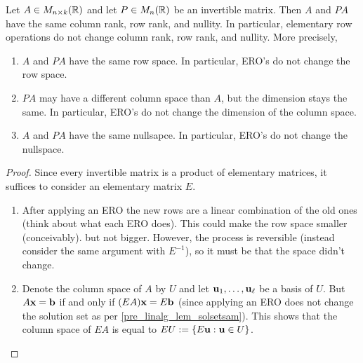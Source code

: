 \documentclass[10pt, a4paper]{article}
\begin{document}
\begin{proposition}\label{pre_linalg_prop_invmatrsameranksandnul}
    Let $A \in M_{n \times k}(\mathbb{R})$ and let $P \in M_{n}(\mathbb{R})$ be an invertible matrix.
    Then $A$ and $PA$ have the same column rank,
    row rank,
    and nullity.
    In particular,
    elementary row operations do not change column rank,
    row rank,
    and nullity.
    More precisely,
    \begin{enumerate}
        \item $A$ and $PA$ have the same row space.
        In particular,
        ERO's do not change the row space.
        \item $PA$ may have a different column space than $A$,
        but the dimension stays the same.
        In particular,
        ERO's do not change the dimension of the column space.
        \item $A$ and $PA$ have the same nullsapce.
        In particular,
        ERO's do not change the nullspace.
    \end{enumerate}

    \begin{proof}
        Since every invertible matrix is a product of elementary matrices,
        it suffices to consider an elementary matrix $E$.
        \begin{enumerate}[label = (\roman*)]
            \item After applying an ERO the new rows are a linear combination of the old ones
            (think about what each ERO does).
            This could make the row space smaller
            (conceivably).
            but not bigger.
            However,
            the process is reversible
            (instead consider the same argument with $E ^ {-1}$),
            so it must be that the space didn't change.
            \item Denote the column space of $A$ by $U$ and let $\mathbf{u}_1, \dotsc, \mathbf{u}_{\ell}$ be a basis of $U$.
            But $A\mathbf{x} = \mathbf{b}$ if and only if $(EA)\mathbf{x} = E\mathbf{b}$
            (since applying an ERO does not change the solution set as per \autoref{pre_linalg_lem_solsetsam}).
            This shows that the column space of $EA$ is equal to $EU := \{E\mathbf{u} : \mathbf{u} \in U\}$.


\end{enumerate}
\end{proof}
\end{proposition}
\end{document}
